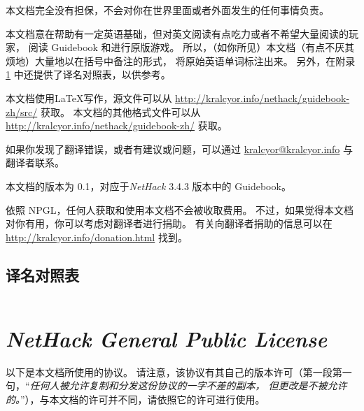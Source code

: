 \documentclass[a4paper, 10pt]{article}
\begin{document}
本文档完全没有担保，不会对你在\zhTransDungeon{}世界里面或者外面发生的任何事情负责。

本文档意在帮助有一定英语基础，但对英文阅读有点吃力或者不希望大量阅读的玩家，
阅读 Guidebook 和进行原版游戏。
所以，（如你所见）本文档（有点不厌其烦地）大量地以在括号中备注的形式，
将原始英语单词标注出来。
另外，在附录 \ref{appedix:En-Zh} 中还提供了译名对照表，以供参考。

本文档使用\LaTeX 写作，源文件可以从
\url{http://kralcyor.info/nethack/guidebook-zh/src/} 获取。
本文档的其他格式文件可以从
\url{http://kralcyor.info/nethack/guidebook-zh/} 获取。

如果你发现了翻译错误，或者有建议或问题，可以通过
\href{mailto:kralcyor@kralcyor.info}{kralcyor@kralcyor.info}
与翻译者联系。

本文档的版本为 0.1，对应于{\it NetHack} 3.4.3 版本中的 Guidebook。

依照 NPGL，任何人获取和使用本文档不会被收取费用。
不过，如果觉得本文档对你有用，你可以考虑对翻译者进行捐助。
有关向翻译者捐助的信息可以在 \url{http://kralcyor.info/donation.html} 找到。

\twocolumn
\begin{strip}
\section{译名对照表}
\label{appedix:En-Zh}
\end{strip}

\begin{supertabular}{ll}

\end{supertabular}

\onecolumn

\section{\it NetHack General Public License}
\label{appendix:NGPL}

以下是本文档所使用的协议。
请注意，该协议有其自己的版本许可（第一段第一句，“{\it 任何人被允许复制和分发这份协议的一字不差的副本，
但更改是不被允许的。}”），与本文档的许可并不同，请依照它的许可进行使用。

%
\end{document}
